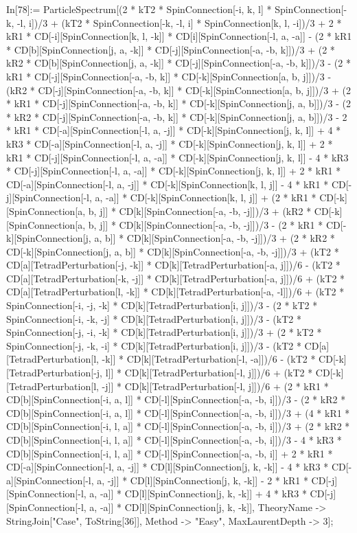 In[78]:= ParticleSpectrum[(2 * kT2 * SpinConnection[-i, k, l] * SpinConnection[-k, -l, i])/3 + (kT2 * SpinConnection[-k, -l, i] * SpinConnection[k, l, -i])/3 + 2 * kR1 * CD[-i][SpinConnection[k, l, -k]] * CD[i][SpinConnection[-l, a, -a]] - (2 * kR1 * CD[b][SpinConnection[j, a, -k]] * CD[-j][SpinConnection[-a, -b, k]])/3 + (2 * kR2 * CD[b][SpinConnection[j, a, -k]] * CD[-j][SpinConnection[-a, -b, k]])/3 - (2 * kR1 * CD[-j][SpinConnection[-a, -b, k]] * CD[-k][SpinConnection[a, b, j]])/3 - (kR2 * CD[-j][SpinConnection[-a, -b, k]] * CD[-k][SpinConnection[a, b, j]])/3 + (2 * kR1 * CD[-j][SpinConnection[-a, -b, k]] * CD[-k][SpinConnection[j, a, b]])/3 - (2 * kR2 * CD[-j][SpinConnection[-a, -b, k]] * CD[-k][SpinConnection[j, a, b]])/3 - 2 * kR1 * CD[-a][SpinConnection[-l, a, -j]] * CD[-k][SpinConnection[j, k, l]] + 4 * kR3 * CD[-a][SpinConnection[-l, a, -j]] * CD[-k][SpinConnection[j, k, l]] + 2 * kR1 * CD[-j][SpinConnection[-l, a, -a]] * CD[-k][SpinConnection[j, k, l]] - 4 * kR3 * CD[-j][SpinConnection[-l, a, -a]] * CD[-k][SpinConnection[j, k, l]] + 2 * kR1 * CD[-a][SpinConnection[-l, a, -j]] * CD[-k][SpinConnection[k, l, j]] - 4 * kR1 * CD[-j][SpinConnection[-l, a, -a]] * CD[-k][SpinConnection[k, l, j]] + (2 * kR1 * CD[-k][SpinConnection[a, b, j]] * CD[k][SpinConnection[-a, -b, -j]])/3 + (kR2 * CD[-k][SpinConnection[a, b, j]] * CD[k][SpinConnection[-a, -b, -j]])/3 - (2 * kR1 * CD[-k][SpinConnection[j, a, b]] * CD[k][SpinConnection[-a, -b, -j]])/3 + (2 * kR2 * CD[-k][SpinConnection[j, a, b]] * CD[k][SpinConnection[-a, -b, -j]])/3 + (kT2 * CD[a][TetradPerturbation[-j, -k]] * CD[k][TetradPerturbation[-a, j]])/6 - (kT2 * CD[a][TetradPerturbation[-k, -j]] * CD[k][TetradPerturbation[-a, j]])/6 + (kT2 * CD[a][TetradPerturbation[l, -k]] * CD[k][TetradPerturbation[-a, -l]])/6 + (kT2 * SpinConnection[-i, -j, -k] * CD[k][TetradPerturbation[i, j]])/3 - (2 * kT2 * SpinConnection[-i, -k, -j] * CD[k][TetradPerturbation[i, j]])/3 - (kT2 * SpinConnection[-j, -i, -k] * CD[k][TetradPerturbation[i, j]])/3 + (2 * kT2 * SpinConnection[-j, -k, -i] * CD[k][TetradPerturbation[i, j]])/3 - (kT2 * CD[a][TetradPerturbation[l, -k]] * CD[k][TetradPerturbation[-l, -a]])/6 - (kT2 * CD[-k][TetradPerturbation[-j, l]] * CD[k][TetradPerturbation[-l, j]])/6 + (kT2 * CD[-k][TetradPerturbation[l, -j]] * CD[k][TetradPerturbation[-l, j]])/6 + (2 * kR1 * CD[b][SpinConnection[-i, a, l]] * CD[-l][SpinConnection[-a, -b, i]])/3 - (2 * kR2 * CD[b][SpinConnection[-i, a, l]] * CD[-l][SpinConnection[-a, -b, i]])/3 + (4 * kR1 * CD[b][SpinConnection[-i, l, a]] * CD[-l][SpinConnection[-a, -b, i]])/3 + (2 * kR2 * CD[b][SpinConnection[-i, l, a]] * CD[-l][SpinConnection[-a, -b, i]])/3 - 4 * kR3 * CD[b][SpinConnection[-i, l, a]] * CD[-l][SpinConnection[-a, -b, i]] + 2 * kR1 * CD[-a][SpinConnection[-l, a, -j]] * CD[l][SpinConnection[j, k, -k]] - 4 * kR3 * CD[-a][SpinConnection[-l, a, -j]] * CD[l][SpinConnection[j, k, -k]] - 2 * kR1 * CD[-j][SpinConnection[-l, a, -a]] * CD[l][SpinConnection[j, k, -k]] + 4 * kR3 * CD[-j][SpinConnection[-l, a, -a]] * CD[l][SpinConnection[j, k, -k]], TheoryName -> StringJoin["Case", ToString[36]], Method -> "Easy", MaxLaurentDepth -> 3]; 